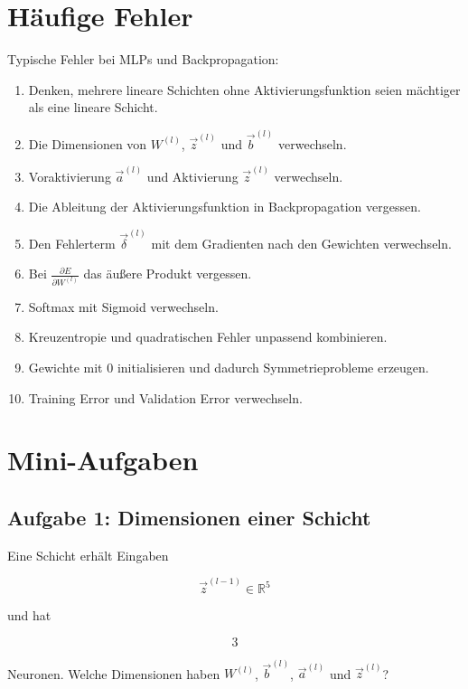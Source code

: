 \section{Häufige Fehler}

\begin{examtipbox}
Typische Fehler bei MLPs und Backpropagation:

\begin{enumerate}
    \item Denken, mehrere lineare Schichten ohne Aktivierungsfunktion seien mächtiger als eine lineare Schicht.
    \item Die Dimensionen von \(W^{(l)}\), \(\vec{z}^{(l)}\) und \(\vec{b}^{(l)}\) verwechseln.
    \item Voraktivierung \(\vec{a}^{(l)}\) und Aktivierung \(\vec{z}^{(l)}\) verwechseln.
    \item Die Ableitung der Aktivierungsfunktion in Backpropagation vergessen.
    \item Den Fehlerterm \(\vec{\delta}^{(l)}\) mit dem Gradienten nach den Gewichten verwechseln.
    \item Bei \(\frac{\partial E}{\partial W^{(l)}}\) das äußere Produkt vergessen.
    \item Softmax mit Sigmoid verwechseln.
    \item Kreuzentropie und quadratischen Fehler unpassend kombinieren.
    \item Gewichte mit \(0\) initialisieren und dadurch Symmetrieprobleme erzeugen.
    \item Training Error und Validation Error verwechseln.
\end{enumerate}
\end{examtipbox}

\section{Mini-Aufgaben}

\subsection{Aufgabe 1: Dimensionen einer Schicht}

Eine Schicht erhält Eingaben

\[
    \vec{z}^{(l-1)}\in\mathbb{R}^{5}
\]

und hat

\[
    3
\]

Neuronen.
Welche Dimensionen haben \(W^{(l)}\), \(\vec{b}^{(l)}\), \(\vec{a}^{(l)}\) und \(\vec{z}^{(l)}\)?

